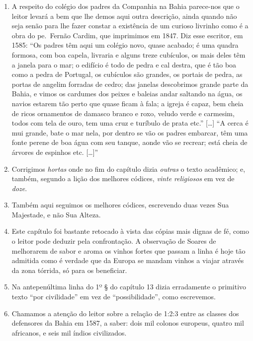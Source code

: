 \begin{enumerate}
\item  A respeito do colégio dos padres da Companhia na Bahia parece-nos
que o leitor levará a bem que lhe demos aqui outra descrição, ainda quando
não seja senão para lhe fazer constar a existência de um curioso livrinho
como é a obra do pe.~Fernão Cardim, que imprimimos em 1847.
Diz esse escritor, em 1585: ``Os padres têm aqui um colégio novo, quase acabado; é 
uma quadra formosa, com boa capela, livraria e alguns treze cubículos, os mais deles têm a 
janela para o mar; o edifício é todo de pedra e cal destra, que é tão boa como a pedra de 
Portugal, os cubículos são grandes, os portais de pedra, as portas de angelim forradas de 
cedro; das janelas descobrimos grande parte da Bahia, e vimos os cardumes dos peixes e 
baleias andar saltando na água, os navios estarem tão perto que quase ficam à fala; a igreja é 
capaz, bem cheia de ricos ornamentos de damasco branco e roxo, veludo verde e carmesim, 
todos com tela de ouro, tem uma cruz e turíbulo de prata etc.'' [\ldots] 
``A cerca é mui grande, bate o mar nela, por dentro se vão os padres embarcar, têm uma 
fonte perene de boa água com seu tanque, aonde vão se recrear; está cheia de árvores de 
espinhos etc. [\ldots]''

\item Corrigimos \textit{hortas} onde no fim do capítulo dizia \textit{outras} o texto acadêmico; e, 
também, segundo a lição dos melhores códices, \textit{vinte religiosos}  em vez de \textit{doze}. 

\item Também aqui seguimos os melhores códices, escrevendo duas vezes Sua Majestade, 
e não Sua Alteza.

\item Este capítulo foi bastante retocado à vista das cópias mais dignas de fé, como o 
leitor pode deduzir pela confrontação. A observação de Soares de melhorarem de sabor 
e aroma os vinhos fortes que passam a linha é hoje tão admitida como é verdade que da 
Europa se mandam vinhos a viajar através da zona tórrida, só para os beneficiar.

\item Na antepenúltima linha do 1º § do capítulo 13 dizia erradamente o primitivo texto 
``por civilidade''  em vez de ``possibilidade'',  como escrevemos.

\item Chamamos a atenção do leitor sobre a relação de 1:2:3 entre as classes dos 
defensores da Bahia em 1587, a saber: dois mil colonos europeus, quatro mil africanos, 
e seis mil índios civilizados.


\end{enumerate}
